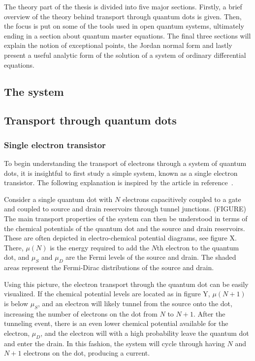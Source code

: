 \documentclass[../main.tex]{subfiles}
\begin{document}
The theory part of the thesis is divided into five major sections. Firstly, a brief overview of the theory behind transport through quantum dots is given. Then, the focus is put on some of the tools used in open quantum systems, ultimately ending in a section about quantum master equations. The final three sections will explain the notion of exceptional points, the Jordan normal form and lastly present a useful analytic form of the solution of a system of ordinary differential equations.
\subsection{The system}
\subsection{Transport through quantum dots}
\subsubsection{Single electron transistor}
To begin understanding the transport of electrons through a system of quantum dots, it is insightful to first study a simple system, known as a single electron transistor. The following explanation is inspired by the article in reference~\cite{transport}.

Consider a single quantum dot with $N$ electrons capacitively coupled to a gate and coupled to source and drain reservoirs through tunnel junctions. (FIGURE) The main transport properties of the system can then be understood in terms of the chemical potentials of the quantum dot and the source and drain reservoirs. These are often depicted in electro-chemical potential diagrams, see figure X. There, $\mu(N)$ is the energy required to add the $N$th electron to the quantum dot, and $\mu_S$ and $\mu_D$ are the Fermi levels of the source and drain. The shaded areas represent the Fermi-Dirac distributions of the source and drain.
 
Using this picture, the electron transport through the quantum dot can be easily visualized. If the chemical potential levels are located as in figure Y, $\mu(N + 1)$ is below $\mu_S$, and an electron will likely tunnel from the source onto the dot, increasing the number of electrons on the dot from $N$ to $N+1$. After the tunneling event, there is an even lower chemical potential available for the electron, $\mu_D$, and the electron will with a high probability leave the quantum dot and enter the drain. In this fashion, the system will cycle through having $N$ and $N+1$ electrons on the dot, producing a current.  
\end{document}
